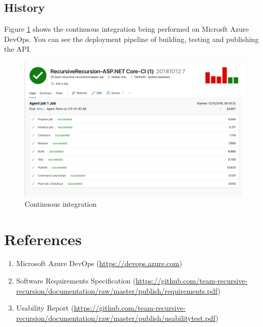 \documentclass{article}
\begin{document}
    \subsection{History}
    \label{sec:api-hist}

    Figure \ref{fig:integration} shows the continuous integration being
    performed on Microsft Azure DevOps. You can see the deployment pipeline of
    building, testing and publishing the API.

    \begin{figure}[H]
        \centering
        \includegraphics[scale=0.35]{Integration}
        \caption{Continuous integration}
        \label{fig:integration}
    \end{figure}

    \newpage

    
    \section{References}

    \begin{enumerate}
        \item Microsoft Azure DevOps (\url{https://devops.azure.com})
        \item Software Requirements Specification
        (\url{https://github.com/team-recursive-recursion/documentation/raw/master/publish/requirements.pdf})
        \item Usability Report
        (\url{https://github.com/team-recursive-recursion/documentation/raw/master/publish/usabilitytest.pdf})
    \end{enumerate}
\end{document}

